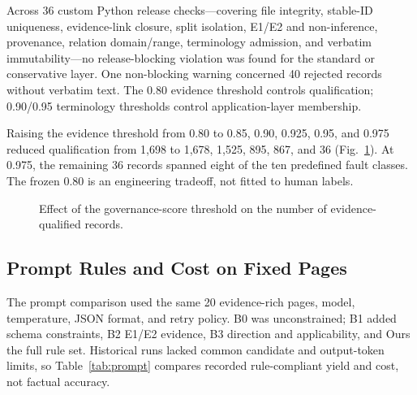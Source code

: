 \documentclass[conference,a4paper]{IEEEtran}
\begin{document}
Across 36 custom Python release checks---covering file integrity, stable-ID uniqueness, evidence-link closure, split isolation, E1/E2 and non-inference, provenance, relation domain/range, terminology admission, and verbatim immutability---no release-blocking violation was found for the standard or conservative layer. One non-blocking warning concerned 40 rejected records without verbatim text. The 0.80 evidence threshold controls qualification; 0.90/0.95 terminology thresholds control application-layer membership.

Raising the evidence threshold from 0.80 to 0.85, 0.90, 0.925, 0.95, and 0.975 reduced qualification from 1,698 to 1,678, 1,525, 895, 867, and 36 (Fig.~\ref{fig:threshold}). At 0.975, the remaining 36 records spanned eight of the ten predefined fault classes. The frozen 0.80 is an engineering tradeoff, not fitted to human labels.

\begin{figure}[t]
\centering
{}
\caption{Effect of the governance-score threshold on the number of evidence-qualified records.}
\label{fig:threshold}
\end{figure}

\subsection{Prompt Rules and Cost on Fixed Pages}

The prompt comparison used the same 20 evidence-rich pages, model, temperature, JSON format, and retry policy. B0 was unconstrained; B1 added schema constraints, B2 E1/E2 evidence, B3 direction and applicability, and Ours the full rule set. Historical runs lacked common candidate and output-token limits, so Table~\ref{tab:prompt} compares recorded rule-compliant yield and cost, not factual accuracy.
\end{document}

